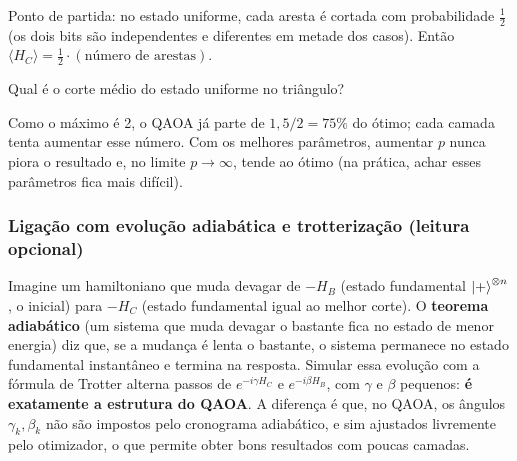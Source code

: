 Ponto de partida: no estado uniforme, cada aresta é cortada com probabilidade \(\tfrac12\) (os dois bits são independentes e diferentes em metade dos casos). Então \(\langle H_C\rangle = \tfrac12\cdot(\text{número de arestas})\).

Qual é o corte médio do estado uniforme no triângulo?

Como o máximo é 2, o QAOA já parte de \(1{,}5/2 = 75\%\) do ótimo; cada camada tenta aumentar esse número. Com os melhores parâmetros, aumentar \(p\) nunca piora o resultado e, no limite \(p\to\infty\), tende ao ótimo (na prática, achar esses parâmetros fica mais difícil).

\subsubsection{Ligação com evolução adiabática e trotterização (leitura opcional)}\label{ligauxe7uxe3o-com-evoluuxe7uxe3o-adiabuxe1tica-e-trotterizauxe7uxe3o-leitura-opcional}

Imagine um hamiltoniano que muda devagar de \(-H_B\) (estado fundamental \(\left|{+}\right>^{\otimes n}\), o inicial) para \(-H_C\) (estado fundamental igual ao melhor corte). O \textbf{teorema adiabático} (um sistema que muda devagar o bastante fica no estado de menor energia) diz que, se a mudança é lenta o bastante, o sistema permanece no estado fundamental instantâneo e termina na resposta. Simular essa evolução com a fórmula de Trotter alterna passos de \(e^{-i\gamma H_C}\) e \(e^{-i\beta H_B}\), com \(\gamma\) e \(\beta\) pequenos: \textbf{é exatamente a estrutura do QAOA}. A diferença é que, no QAOA, os ângulos \(\gamma_k,\beta_k\) não são impostos pelo cronograma adiabático, e sim ajustados livremente pelo otimizador, o que permite obter bons resultados com poucas camadas.

